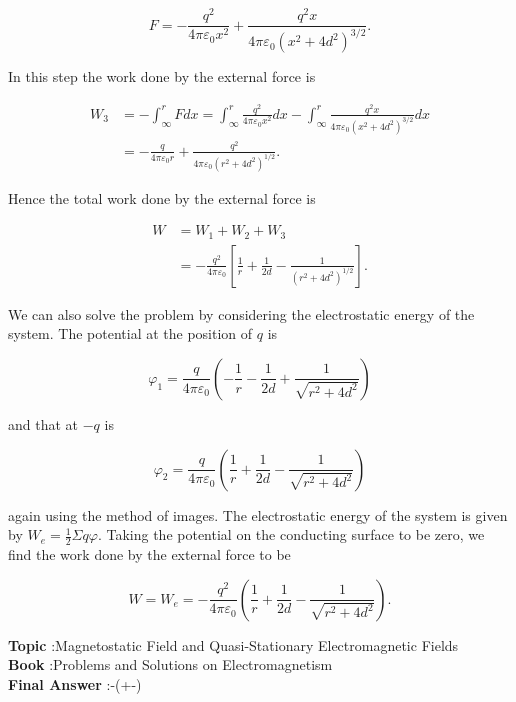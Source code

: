 \documentclass[10pt]{article}
\begin{document}
$$
F=-\frac{q^{2}}{4 \pi \varepsilon_{0} x^{2}}+\frac{q^{2} x}{4 \pi \varepsilon_{0}\left(x^{2}+4 d^{2}\right)^{3 / 2}} .
$$

In this step the work done by the external force is

$$
\begin{aligned}
W_{3} &=-\int_{\infty}^{r} F d x=\int_{\infty}^{r} \frac{q^{2}}{4 \pi \varepsilon_{0} x^{2}} d x-\int_{\infty}^{r} \frac{q^{2} x}{4 \pi \varepsilon_{0}\left(x^{2}+4 d^{2}\right)^{3 / 2}} d x \\
&=-\frac{q}{4 \pi \varepsilon_{0} r}+\frac{q^{2}}{4 \pi \varepsilon_{0}\left(r^{2}+4 d^{2}\right)^{1 / 2}} .
\end{aligned}
$$

Hence the total work done by the external force is

$$
\begin{aligned}
W &=W_{1}+W_{2}+W_{3} \\
&=-\frac{q^{2}}{4 \pi \varepsilon_{0}}\left[\frac{1}{r}+\frac{1}{2 d}-\frac{1}{\left(r^{2}+4 d^{2}\right)^{1 / 2}}\right] .
\end{aligned}
$$

We can also solve the problem by considering the electrostatic energy of the system. The potential at the position of $q$ is

$$
\varphi_{1}=\frac{q}{4 \pi \varepsilon_{0}}\left(-\frac{1}{r}-\frac{1}{2 d}+\frac{1}{\sqrt{r^{2}+4 d^{2}}}\right)
$$

and that at $-q$ is

$$
\varphi_{2}=\frac{q}{4 \pi \varepsilon_{0}}\left(\frac{1}{r}+\frac{1}{2 d}-\frac{1}{\sqrt{r^{2}+4 d^{2}}}\right)
$$

again using the method of images. The electrostatic energy of the system is given by $W_{e}=\frac{1}{2} \Sigma q \varphi$. Taking the potential on the conducting surface to be zero, we find the work done by the external force to be

$$
W=W_{e}=-\frac{q^{2}}{4 \pi \varepsilon_{0}}\left(\frac{1}{r}+\frac{1}{2 d}-\frac{1}{\sqrt{r^{2}+4 d^{2}}}\right) .
$$

\textbf{Topic} :Magnetostatic Field and Quasi-Stationary Electromagnetic Fields\\
\textbf{Book} :Problems and Solutions on Electromagnetism\\
\textbf{Final Answer} :-\left(+-\right)\\
\end{document}
